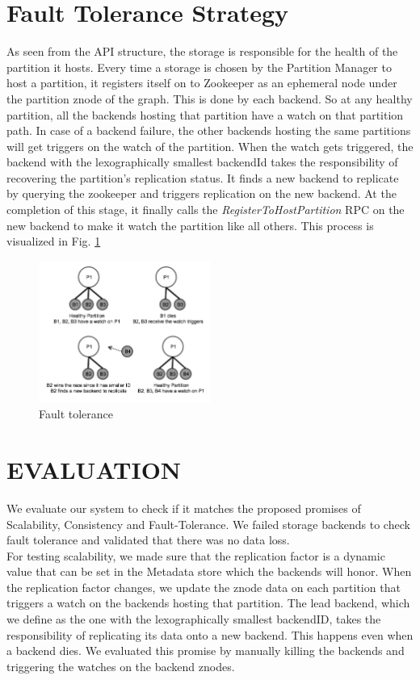 \documentclass[letterpaper, 11 pt, conference]{ieeeconf}  %
\begin{document}
\section{Fault Tolerance Strategy}
As seen from the API structure, the storage is responsible for the health of the partition it hosts. Every time a storage is chosen by the Partition Manager to host a partition, it registers itself on to Zookeeper as an ephemeral node under the partition znode of the graph. This is done by each backend. So at any healthy partition, all the backends hosting that partition have a watch on that partition path. In case of a backend failure, the other backends hosting the same partitions will get triggers on the watch of the partition. When the watch gets triggered, the backend with the lexographically smallest backendId takes the responsibility of recovering the partition's replication status. It finds a new backend to replicate by querying the zookeeper and triggers replication on the new backend. At the completion of this stage, it finally calls the \textit{RegisterToHostPartition} RPC on the new backend to make it watch the partition like all others. This process is visualized in Fig. \ref{fig:fault} 


\begin{figure}
 \centering
  \includegraphics[width=0.5\textwidth]{fault.png}
\caption{Fault tolerance}
\label{fig:fault}
\end{figure}

\section{EVALUATION}
We evaluate our system to check if it matches the proposed promises of Scalability, Consistency and Fault-Tolerance. We failed storage backends to check fault tolerance and validated that there was no data loss. \\

For testing scalability, we made sure that the replication factor is a dynamic value that can be set in the Metadata store which the backends will honor. When the replication factor changes, we update the znode data on each partition that triggers a watch on the backends hosting that partition. The lead backend, which we define as the one with the lexographically smallest backendID, takes the responsibility of replicating its data onto a new backend. This happens even when a backend dies. We evaluated this promise by manually killing the backends and triggering the watches on the backend znodes. \\
\end{document}
